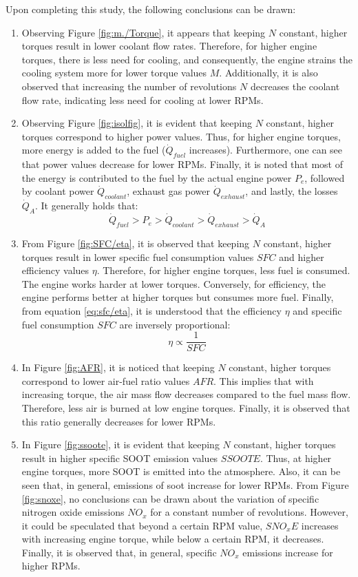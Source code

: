\documentclass{report}
\begin{document}
Upon completing this study, the following conclusions can be drawn:
\begin{enumerate}
    \item Observing Figure \ref{fig:m./Torque}, it appears that keeping $N$ constant, higher torques result in lower coolant flow rates. Therefore, for higher engine torques, there is less need for cooling, and consequently, the engine strains the cooling system more for lower torque values $M$. Additionally, it is also observed that increasing the number of revolutions $N$ decreases the coolant flow rate, indicating less need for cooling at lower RPMs.
    \item Observing Figure \ref{fig:isolfig}, it is evident that keeping $N$ constant, higher torques correspond to higher power values. Thus, for higher engine torques, more energy is added to the fuel ($\dot{Q}_{fuel}$ increases). Furthermore, one can see that power values decrease for lower RPMs. Finally, it is noted that most of the energy is contributed to the fuel by the actual engine power $P_e$, followed by coolant power $\dot{Q}_{coolant}$, exhaust gas power $\dot{Q}_{exhaust}$, and lastly, the losses $\dot{Q}_A$. It generally holds that: $$\dot{Q}_{fuel}>P_e>\dot{Q}_{coolant}>\dot{Q}_{exhaust}>\dot{Q}_A$$
    \item From Figure \ref{fig:SFC/eta}, it is observed that keeping $N$ constant, higher torques result in lower specific fuel consumption values $SFC$ and higher efficiency values $\eta$. Therefore, for higher engine torques, less fuel is consumed. The engine works harder at lower torques. Conversely, for efficiency, the engine performs better at higher torques but consumes more fuel. Finally, from equation \ref{eq:sfc/eta}, it is understood that the efficiency $\eta$ and specific fuel consumption $SFC$ are inversely proportional:
    $$\eta\propto\frac{1}{SFC}$$
    \item In Figure \ref{fig:AFR}, it is noticed that keeping $N$ constant, higher torques correspond to lower air-fuel ratio values $AFR$. This implies that with increasing torque, the air mass flow decreases compared to the fuel mass flow. Therefore, less air is burned at low engine torques. Finally, it is observed that this ratio generally decreases for lower RPMs.
    \item In Figure \ref{fig:ssoote}, it is evident that keeping $N$ constant, higher torques result in higher specific SOOT emission values $SSOOTE$. Thus, at higher engine torques, more SOOT is emitted into the atmosphere. Also, it can be seen that, in general, emissions of soot increase for lower RPMs. From Figure \ref{fig:snoxe}, no conclusions can be drawn about the variation of specific nitrogen oxide emissions $NO_x$ for a constant number of revolutions. However, it could be speculated that beyond a certain RPM value, $SNO_xE$ increases with increasing engine torque, while below a certain RPM, it decreases. Finally, it is observed that, in general, specific $NO_x$ emissions increase for higher RPMs.
\end{enumerate}
\newpage
\end{document}
